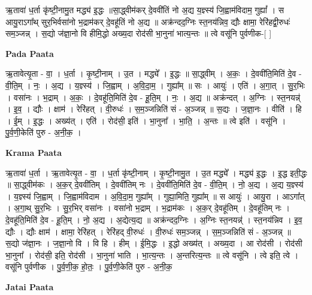 \documentclass[17pt]{extarticle}
\begin{document}
ऋ॒तावा॑ ध॒र्ता कृ॑ष्टी॒नामु॒त मद्ध्य॑ इ॒द्धः ॥सा॒द्ध्वीम॑कर् दे॒ववी॑तिं नो अ॒द्य य॒ज्ञ्स्य॑ जि॒ह्वाम॑विदाम॒ गुह्यां᳚ । स आयु॒राऽगा᳚थ् सुर॒भिर्वसा॑नो भ॒द्राम॑कर् दे॒वहू॑तिं नो अ॒द्य ॥ अक्र॑न्दद॒ग्निः स्त॒नय॑न्निव॒ द्यौः क्षामा॒ रेरि॑हद्वी॒रुधः॑ सम॒ञ्जन्न् । स॒द्यो ज॑ज्ञा॒नो वि हीमि॒द्धो अख्य॒दा रोद॑सी भा॒नुना॑ भात्य॒न्तः ॥ त्वे वसू॑नि पुर्वणीक-[ ] \newline

\textbf{Pada Paata} \newline

ऋ॒तावेत्यृ॒ता - वा॒ । ध॒र्ता । कृ॒ष्टी॒नाम् । उ॒त । मद्ध्ये᳚ । इ॒द्धः ॥ सा॒द्ध्वीम् । अ॒कः॒ । दे॒ववी॑ति॒मिति॑ दे॒व - वी॒ति॒म् । नः॒ । अ॒द्य । य॒ज्ञ्स्य॑ । जि॒ह्वाम् । अ॒वि॒दा॒म॒ । गुह्या᳚म् ॥ सः । आयुः॑ । एति॑ । अ॒गा॒त् । सु॒र॒भिः । वसा॑नः । भ॒द्राम् । अ॒कः॒ । दे॒वहू॑ति॒मिति॑ दे॒व - हू॒ति॒म् । नः॒ । अ॒द्य ॥ अक्र॑न्दत् । अ॒ग्निः । स्त॒नयन्न्॑ । इ॒व॒ । द्यौः । क्षाम॑ । रेरि॑हत् । वी॒रुधः॑ । स॒म॒ञ्जन्निति॑ सं - अ॒ञ्जन्न् ॥ स॒द्यः । ज॒ज्ञा॒नः । वीति॑ । हि । ई॒म् । इ॒द्धः । अख्य॑त् । एति॑ । रोद॑सी॒ इति॑ । भा॒नुना᳚ । भा॒ति॒ । अ॒न्तः ॥ त्वे इति॑ । वसू॑नि । पु॒र्व॒णी॒केति॑ पुरु - अ॒नी॒क॒ ।  \newline


\textbf{Krama Paata} \newline

ऋ॒तावा॑ ध॒र्ता । ऋ॒तावेत्यृ॒त - वा॒ । ध॒र्ता कृ॑ष्टी॒नाम् । कृ॒ष्टी॒नामु॒त । उ॒त मद्ध्ये᳚ । मद्ध्य॑ इ॒द्धः । इ॒द्ध इती॒द्धः ॥ सा॒द्ध्वीम॑कः । अ॒क॒र् दे॒ववी॑तिम् । दे॒ववी॑तिम् नः । दे॒ववी॑ति॒मिति॑ दे॒व - वी॒ति॒म् । नो॒ अ॒द्य । अ॒द्य य॒ज्ञ्स्य॑ । य॒ज्ञ्स्य॑ जि॒ह्वाम् । जि॒ह्वाम॑विदाम । अ॒वि॒दा॒म॒ गुह्या᳚म् । गुह्या॒मिति॒ गुह्या᳚म् ॥ स आयुः॑ । आयु॒रा । आऽगा᳚त् । अ॒गा॒थ् सु॒र॒भिः । सु॒र॒भिर् वसा॑नः । वसा॑नो भ॒द्राम् । भ॒द्राम॑कः । अ॒क॒र् दे॒वहू॑तिम् । दे॒वहू॑तिम् नः । दे॒वहू॑ति॒मिति॑ दे॒व - हू॒ति॒म् । नो॒ अ॒द्य । अ॒द्येत्य॒द्य ॥ अक्र॑न्दद॒ग्निः । अ॒ग्निः स्त॒नयन्न्॑ । स्त॒नय॑न्निव । इ॒व॒ द्यौः । द्यौः क्षाम॑ । क्षामा॒ रेरि॑हत् । रेरि॑हद् वी॒रुधः॑ । वी॒रुधः॑ सम॒ञ्जन्न् । स॒म॒ञ्जन्निति॑ सं - अ॒ञ्जन्न् ॥ स॒द्यो ज॑ज्ञा॒नः । ज॒ज्ञा॒नो वि । वि हि । हीम् । ई॒मि॒द्धः । इ॒द्धो अख्य॑त् । अख्य॒दा । आ रोद॑सी । रोद॑सी भा॒नुना᳚ । रोद॑सी॒ इति॒ रोद॑सी । भा॒नुना॑ भाति । भा॒त्य॒न्तः । अ॒न्तरित्य॒न्तः ॥ त्वे वसू॑नि । त्वे इति॒ त्वे । वसू॑नि पुर्वणीक । पु॒र्व॒णी॒क॒ हो॒तः॒ । पु॒र्व॒णी॒केति॑ पुरु - अ॒नी॒क॒ \newline

\textbf{Jatai Paata} \newline
\end{document}
